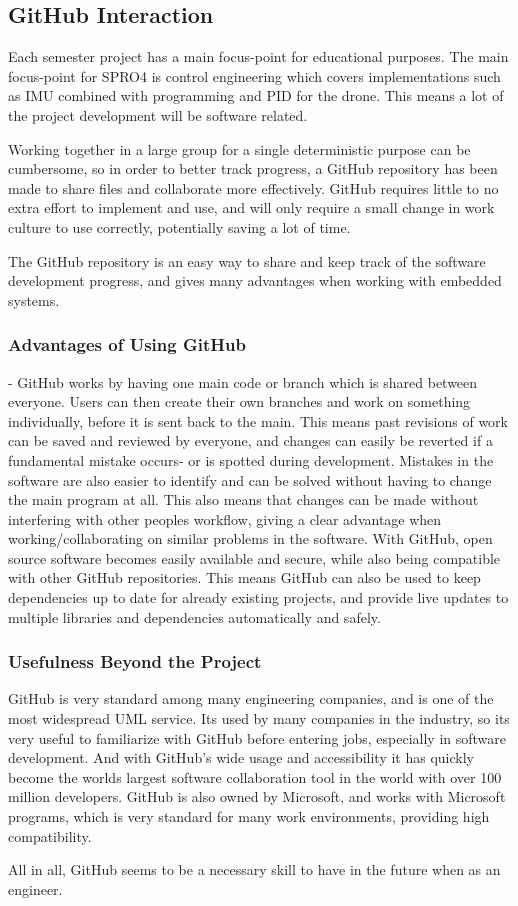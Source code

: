 \subsection{GitHub Interaction}
Each semester project has a main focus-point for educational purposes. The main focus-point for SPRO4 is control engineering which covers implementations such as IMU combined with programming and PID for the drone. This means a lot of the project development will be software related.

Working together in a large group for a single deterministic purpose can be cumbersome, so in order to better track progress, a GitHub repository has been made to share files and collaborate more effectively. GitHub requires little to no extra effort to implement and use, and will only require a small change in work culture to use correctly, potentially saving a lot of time.

 The GitHub repository is an easy way to share and keep track of the software development progress, and gives many advantages when working with embedded systems. 

\subsubsection{Advantages of Using GitHub}
- GitHub works by having one main code or branch which is shared between everyone. Users can then create their own branches and work on something individually, before it is sent back to the main. This means past revisions of work can be saved and reviewed by everyone, and changes can easily be reverted if a fundamental mistake occurs- or is spotted during development. Mistakes in the software are also easier to identify and can be solved without having to change the main program at all. This also means that changes can be made without interfering with other peoples workflow, giving a clear advantage when working/collaborating on similar problems in the software.\cite{benefitsGithub}
With GitHub, open source software becomes easily available and secure, while also being compatible with other GitHub repositories. This means GitHub can also be used to keep dependencies up to date for already existing projects, and provide live updates to multiple libraries and dependencies automatically and safely. \cite{githubaccelerates}

\subsubsection{Usefulness Beyond the Project}
GitHub is very standard among many engineering companies, and is one of the most widespread UML service. Its used by many companies in the industry, so its very useful to familiarize with GitHub before entering jobs, especially in software development.
 And with GitHub's wide usage and accessibility it has quickly become the worlds largest software collaboration tool in the world with over 100 million developers.\cite{WhoGithub} GitHub is also owned by Microsoft, and works with Microsoft programs, which is very standard for many work environments, providing high  compatibility.

All in all, GitHub seems to be a necessary skill to have in the future when as an engineer.

